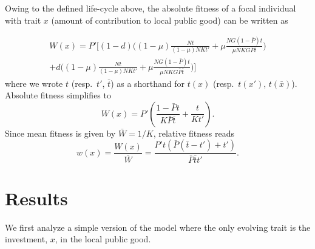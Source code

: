 \documentclass[11pt]{article} %
\newcommand{\gs}{N} %
\newcommand{\Ng}{G} %
\newcommand{\pd}{d} %
\newcommand{\ig}{x} %
\newcommand{\Ps}{P} %
\newcommand{\cm}{t} %
\newcommand{\no}{K} %
\newcommand{\pc}{\mu} %
\newcommand{\aF}{W} %
\newcommand{\rF}{w} %
\begin{document}
Owing to the defined life-cycle above, the absolute fitness of a focal individual with trait $\ig$ (amount of contribution to local public good) can be written as

\begin{multline}
\aF(\ig) = \Ps'\Big[ (1-\pd) \Big( (1-\pc)\frac{\gs \cm}{(1-\pc)\gs\no\cm'} + \pc \frac{\gs\Ng(1-\bar{\Ps})\cm}{\pc\gs\no\Ng\bar{\Ps}\bar{\cm}} \Big) \\
 + \pd \Big( (1-\pc)\frac{\gs \cm}{(1-\pc)\gs\no\cm'} + \pc \frac{\gs\Ng(1-\bar{\Ps})\cm}{\pc\gs\no\Ng\bar{\Ps}\bar{\cm}} \Big) \Big]
\end{multline}
where we wrote $\cm$ (resp.~$\cm'$, $\bar{\cm}$) as a shorthand for $\cm(\ig)$ (resp.~$\cm(\ig')$, $\cm(\bar{\ig})$). Absolute fitness simplifies to
\begin{equation}
\aF(\ig) = \Ps'\left( \frac{1-\bar{\Ps}\cm}{\no\bar{\Ps}\bar{\cm}} + \frac{\cm}{\no\cm'} \right).
\end{equation}
Since mean fitness is given by $\bar{\aF} = 1/\no$, relative fitness reads
\begin{equation}
\rF(\ig) = \frac{\aF(\ig)}{\bar{\aF}} = \frac{\Ps'\cm (\bar{\Ps}(\bar{\cm}-\cm')+\cm')}{\bar{\Ps}\bar{\cm}\cm'}.
\end{equation}


\section{Results}

We first analyze a simple version of the model where the only evolving trait is the investment, $\ig$, in the local public good.
\end{document}
